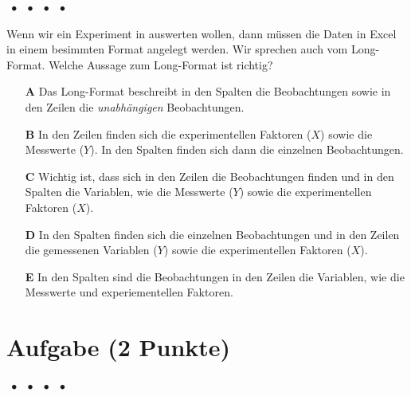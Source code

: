 \documentclass[a4paper, 9pt]{scrartcl}\usepackage[]{graphicx}\usepackage[]{xcolor}
\begin{document}
\ifcollection
\begin{flushright}
\tiny\vspace{-2Ex}
\textbf{\examinhaltstart}
\exammodulemathstat $\;\bullet$
\exammodulestat $\;\bullet$
\exammodulestatbbv $\;\bullet$
\exammodulestatversuch $\;\bullet$
\exammodulebiostat
\vspace{-1Ex}
\end{flushright}
\fi




Wenn wir ein Experiment in \Rlogo auswerten wollen, dann müssen die Daten in Excel in einem besimmten Format angelegt werden. Wir sprechen auch vom Long-Format. Welche Aussage zum Long-Format ist richtig?



\begin{enumerate}
\item [\textbf{A} \msquare] Das Long-Format beschreibt in den Spalten die Beobachtungen sowie in den Zeilen die \textit{unabhängigen} Beobachtungen.
\item [\textbf{B} \msquare] In den Zeilen finden sich die experimentellen Faktoren ($X$) sowie die Messwerte ($Y$). In den Spalten finden sich dann die einzelnen Beobachtungen.
\item [\textbf{C} \msquare] Wichtig ist, dass sich in den Zeilen die Beobachtungen finden und in den Spalten die Variablen, wie die Messwerte ($Y$) sowie die experimentellen Faktoren ($X$).
\item [\textbf{D} \msquare] In den Spalten finden sich die einzelnen Beobachtungen und in den Zeilen die gemessenen Variablen ($Y$) sowie die experimentellen Faktoren ($X$).
\item [\textbf{E} \msquare] In den Spalten sind die Beobachtungen in den Zeilen die Variablen, wie die Messwerte und experiementellen Faktoren.
\end{enumerate} 

\section{Aufgabe \hfill (2 Punkte)}

\ifcollection
\begin{flushright}
\tiny\vspace{-2Ex}
\textbf{\examinhaltstart}
\exammodulemathstat $\;\bullet$
\exammodulestat $\;\bullet$
\exammodulestatbbv $\;\bullet$
\exammodulestatversuch $\;\bullet$
\exammodulebiostat
\vspace{-1Ex}
\end{flushright}
\fi
\end{document}
